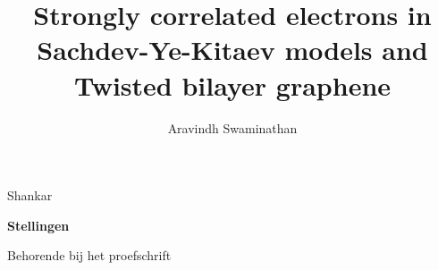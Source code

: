 \documentclass[pdftex,a5paper]{dissertation}
\begin{document}
\title{Strongly correlated electrons in Sachdev-Ye-Kitaev models and Twisted bilayer graphene\\}
\author{Aravindh Swaminathan}{Shankar}

\begin{center}

{\Large\titlefont\bfseries Stellingen\\}

\vspace{2mm}
Behorende bij het proefschrift

\medskip



\bigskip

{\makeatletter
\titlestyle\bfseries\large\@title
\makeatother}

{\makeatletter
\ifx\@subtitle\undefined\else
    \titlefont\titleshape\@subtitle
\fi
\makeatother}

%
%


\end{center}

\smallskip
\end{document}
